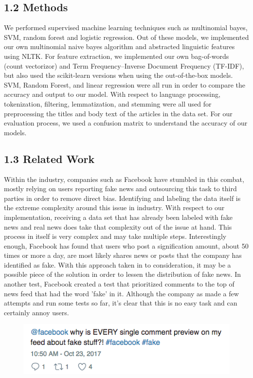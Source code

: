 \documentclass{neu_handout}
\begin{document}
\subsection*{1.2 Methods}
We performed supervised machine learning techniques such as multinomial bayes, SVM, random forest and logistic regression. Out of these models, we implemented our own multinomial naive bayes algorithm and abstracted linguistic features using NLTK. For feature extraction, we implemented our own bag-of-words (count vectorizor) and Term Frequency–Inverse Document Frequency (TF-IDF), but also used the scikit-learn versions when using the out-of-the-box models. SVM, Random Forest, and linear regression were all run in order to compare the accuracy and output to our model. With respect to language processing, tokenization, filtering, lemmatization, and stemming were all used for preprocessing the titles and body text of the articles in the data set. For our evaluation process, we used a confusion matrix to understand the accuracy of our models.

\subsection*{1.3 Related Work}
Within the industry, companies such as Facebook have stumbled in this combat, mostly relying on users reporting fake news and outsourcing this task to third parties in order to remove direct bias. Identifying and labeling the data itself is the extreme complexity around this issue in industry. With respect to our implementation, receiving a data set that has already been labeled with fake news and real news does take that complexity out of the issue at hand. This process in itself is very complex and may take multiple steps. Interestingly enough, Facebook has found that users who post a signification amount, about 50 times or more a day, are most likely shares news or posts that the company has identified as fake. With this approach taken in to consideration, it may be a possible piece of the solution in order to lessen the distribution of fake news. In another test, Facebook created a test that prioritized comments to the top of news feed that had the word 'fake' in it. Although the company as made a few attempts and run some tests so far, it's clear that this is no easy task and can certainly annoy users.

\begin{figure}[h]
\centering
{
\includegraphics[width=0.3\linewidth]{fbfake}
}
\end{figure}
\end{document}
